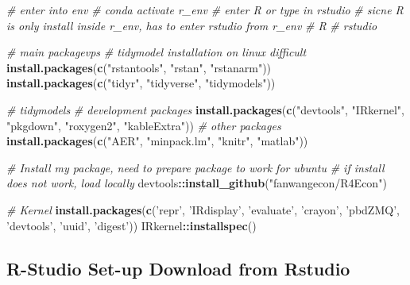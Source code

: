 \documentclass[]{article}
\newenvironment{Shaded}{\begin{snugshade}}{\end{snugshade}}
\newcommand{\CommentTok}[1]{\textcolor[rgb]{0.56,0.35,0.01}{\textit{#1}}}
\newcommand{\KeywordTok}[1]{\textcolor[rgb]{0.13,0.29,0.53}{\textbf{#1}}}
\newcommand{\NormalTok}[1]{#1}
\newcommand{\OperatorTok}[1]{\textcolor[rgb]{0.81,0.36,0.00}{\textbf{#1}}}
\newcommand{\StringTok}[1]{\textcolor[rgb]{0.31,0.60,0.02}{#1}}
\begin{document}
\begin{Shaded}
\begin{Highlighting}[]
\CommentTok{# enter into env}
\CommentTok{# conda activate r_env}
\CommentTok{# enter R or type in rstudio}
\CommentTok{# sicne R is only install inside r_env, has to enter rstudio from r_env}
\CommentTok{# R}
\CommentTok{# rstudio}

\CommentTok{# main packagevps}
\CommentTok{# tidymodel installation on linux difficult}
\KeywordTok{install.packages}\NormalTok{(}\KeywordTok{c}\NormalTok{(}\StringTok{"rstantools"}\NormalTok{, }\StringTok{"rstan"}\NormalTok{, }\StringTok{"rstanarm"}\NormalTok{))}
\KeywordTok{install.packages}\NormalTok{(}\KeywordTok{c}\NormalTok{(}\StringTok{"tidyr"}\NormalTok{, }\StringTok{"tidyverse"}\NormalTok{, }\StringTok{"tidymodels"}\NormalTok{))}

\CommentTok{# tidymodels}
\CommentTok{# development packages}
\KeywordTok{install.packages}\NormalTok{(}\KeywordTok{c}\NormalTok{(}\StringTok{"devtools"}\NormalTok{, }\StringTok{"IRkernel"}\NormalTok{, }\StringTok{"pkgdown"}\NormalTok{, }\StringTok{"roxygen2"}\NormalTok{, }\StringTok{"kableExtra"}\NormalTok{))}
\CommentTok{# other packages}
\KeywordTok{install.packages}\NormalTok{(}\KeywordTok{c}\NormalTok{(}\StringTok{"AER"}\NormalTok{, }\StringTok{"minpack.lm"}\NormalTok{, }\StringTok{"knitr"}\NormalTok{, }\StringTok{"matlab"}\NormalTok{))}

\CommentTok{# Install my package, need to prepare package to work for ubuntu}
\CommentTok{# if install does not work, load locally}
\NormalTok{devtools}\OperatorTok{::}\KeywordTok{install_github}\NormalTok{(}\StringTok{"fanwangecon/R4Econ"}\NormalTok{)}

\CommentTok{# Kernel}
\KeywordTok{install.packages}\NormalTok{(}\KeywordTok{c}\NormalTok{(}\StringTok{'repr'}\NormalTok{, }\StringTok{'IRdisplay'}\NormalTok{, }\StringTok{'evaluate'}\NormalTok{, }\StringTok{'crayon'}\NormalTok{, }\StringTok{'pbdZMQ'}\NormalTok{, }\StringTok{'devtools'}\NormalTok{, }\StringTok{'uuid'}\NormalTok{, }\StringTok{'digest'}\NormalTok{))}
\NormalTok{IRkernel}\OperatorTok{::}\KeywordTok{installspec}\NormalTok{()}
\end{Highlighting}
\end{Shaded}

\hypertarget{r-studio-set-up-download-from-rstudio}{%
\subsection{R-Studio Set-up Download from
Rstudio}\label{r-studio-set-up-download-from-rstudio}}
\end{document}

